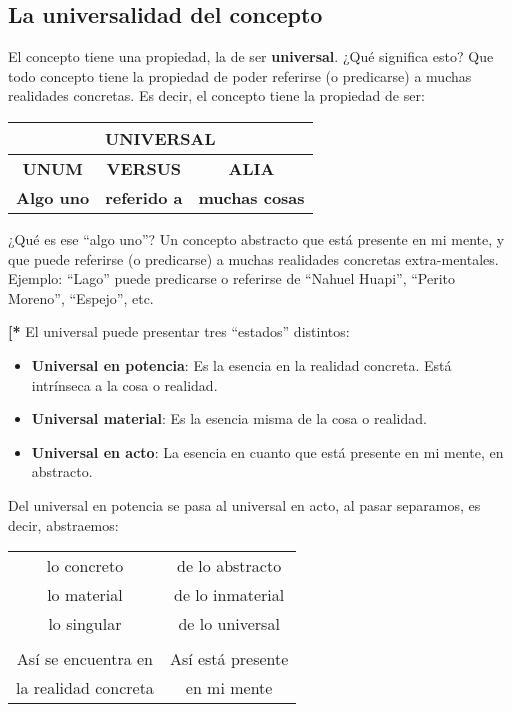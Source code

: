 \documentclass{article}
\begin{document}
\subsection{La universalidad del concepto} 
    El concepto tiene una propiedad, la de ser \textbf{universal}. ¿Qué significa esto? Que todo concepto tiene la propiedad de poder referirse (o predicarse) a muchas realidades concretas. Es decir, el concepto tiene la propiedad de ser: \par
    
\begin{center}
\begin{tabular}{ |c c c| } 
    \hline
    \multicolumn{3}{|c|}{\textbf{UNIVERSAL}} \\
    \hline
    \textbf{UNUM} & \textbf{VERSUS} & \textbf{ALIA} \\
    \textbf{Algo uno} & \textbf{referido a} & \textbf{muchas cosas} \\
    \hline
\end{tabular}
\end{center}
    
    ¿Qué es ese ``algo uno''? Un concepto abstracto que está presente en mi mente, y que puede referirse (o predicarse) a muchas realidades concretas extra-mentales. Ejemplo: ``Lago'' puede predicarse o referirse de ``Nahuel Huapi'', ``Perito Moreno'', ``Espejo'', etc. \par
    
    \noindent \textbf{[*} El universal puede presentar tres ``estados'' distintos: \par

    \begin{itemize}[label={$\bullet$}]
        \item \textbf{Universal en potencia}: Es la esencia en la realidad concreta. Está intrínseca a la cosa o realidad.
        \item \textbf{Universal material}: Es la esencia misma de la cosa o realidad.
        \item \textbf{Universal en acto}: La esencia en  cuanto que está presente en mi mente, en abstracto.
    \end{itemize}
    
    Del universal en potencia se pasa al universal en acto, al pasar separamos, es decir, abstraemos: \par
    
\begin{center}
\begin{tabular}{ c c } 
    lo concreto & de lo abstracto \\
    lo material & de lo inmaterial \\
    lo singular & de lo universal \\ \\
    
    Así se encuentra en & Así está presente \\
    la realidad concreta & en mi mente \\
\end{tabular}
\end{center}
    
\end{document}
